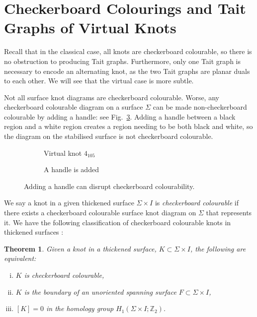 \documentclass[12pt]{report}
\newcommand{\Z}{\mathbb{Z}}
\newtheorem*{theorem}{Theorem}
\theoremstyle{upright}
\begin{document}
\section{Checkerboard Colourings and Tait Graphs of Virtual Knots}

Recall that in the classical case, all knots are checkerboard colourable, so there is no obstruction to producing Tait graphs. Furthermore, only one Tait graph is necessary to encode an alternating knot, as the two Tait graphs are planar duals to each other. We will see that the virtual case is more subtle.

Not all surface knot diagrams are checkerboard colourable. Worse, any checkerboard colourable diagram on a surface $\Sigma$ can be made non-checkerboard colourable by adding a handle: see Fig.~\ref{fig:adding-handle-to-4-105}. Adding a handle between a black region and a white region creates a region needing to be both black and white, so the diagram on the stabilised surface is not checkerboard colourable.

\begin{figure}[hbt]
	\centering
	\hspace*{\fill}
	\begin{subfigure}[b]{0.4 \textwidth}
		\centering
		\def\svgscale{0.35}
		
		\caption{Virtual knot $4_{105}$}
		\label{fig:4-105-vknot}
	\end{subfigure}
	\hspace*{\fill}	\hspace*{\fill}	\hspace*{\fill}
	\begin{subfigure}[b]{0.4 \textwidth}
		\centering
		\def\svgscale{0.35}
		
		\caption{A handle is added}
		\label{fig:4-105-vknot-with-handle}
	\end{subfigure}
	\hspace*{\fill} 
	\caption{Adding a handle can disrupt checkerboard colourability.}
	\label{fig:adding-handle-to-4-105}
\end{figure}

We say a knot in a given thickened surface $\Sigma \times I$ is \textit{checkerboard colourable} if there exists a checkerboard colourable surface knot diagram on $\Sigma$ that represents it. We have the following classification of checkerboard colourable knots in thickened surfaces \cite{minimal-diagrams-surface-links}:

\begin{theorem}
Given a knot in a thickened surface, $K \subset \Sigma \times I$, the following are equivalent:
	\begin{enumerate}[(i)]
	\item $K$ is checkerboard colourable,
	\item $K$ is the boundary of an unoriented spanning surface $F \subset \Sigma \times I$,
	\item $[K] = 0$ in the homology group $H_{1}(\Sigma \times I; \Z_{2})$.
	\end{enumerate} 
\end{theorem}
\end{document}
